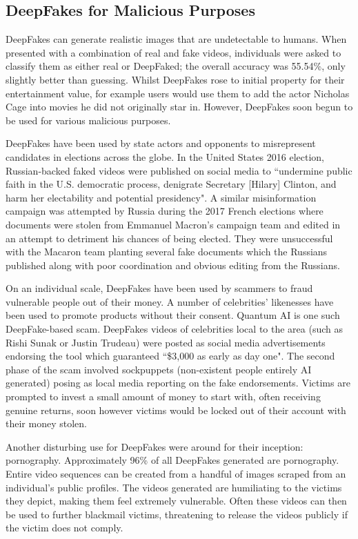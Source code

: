 \subsection{DeepFakes for Malicious Purposes}

DeepFakes can generate realistic images that are undetectable to humans. When presented with a combination of real and fake videos, individuals were asked to classify them as either real or DeepFaked; the overall accuracy was 55.54\%\cite{diel2024human}, only slightly better than guessing. Whilst DeepFakes rose to initial property for their entertainment value, for example users would use them to add the actor Nicholas Cage into movies he did not originally star in\cite{harris2023deep}. However, DeepFakes soon begun to be used for various malicious purposes.

DeepFakes have been used by state actors and opponents to misrepresent candidates in elections across the globe. In the United States 2016 election, Russian-backed faked videos were published on social media to ``undermine public faith in the U.S. democratic process, denigrate Secretary [Hilary] Clinton, and harm her electability and potential presidency"\cite{harris2023deep}. A similar misinformation campaign was attempted by Russia during the 2017 French elections where documents were stolen from Emmanuel Macron's campaign team and edited in an attempt to detriment his chances of being elected\cite{chesney2019deep}. They were unsuccessful with the Macaron team planting several fake documents which the Russians published along with poor coordination and obvious editing from the Russians. 

On an individual scale, DeepFakes have been used by scammers to fraud vulnerable people out of their money. A number of celebrities' likenesses have been used to promote products without their consent. Quantum AI is one such DeepFake-based scam\cite{sensity2024state}. DeepFakes videos of celebrities local to the area (such as Rishi Sunak or Justin Trudeau) were posted as social media advertisements endorsing the tool which guaranteed ``\$3,000 as early as day one". The second phase of the scam involved sockpuppets (non-existent people entirely AI generated) posing as local media reporting on the fake endorsements. Victims are prompted to invest a small amount of money to start with, often receiving genuine returns, soon however victims would be locked out of their account with their money stolen.

Another disturbing use for DeepFakes were around for their inception: pornography. Approximately 96\% of all DeepFakes generated are pornography\cite{ajder2019state}. Entire video sequences can be created from a handful of images scraped from an individual's public profiles\cite{chesney2019deep}. The videos generated are humiliating to the victims they depict, making them feel extremely vulnerable. Often these videos can then be used to further blackmail victims, threatening to release the videos publicly if the victim does not comply.

